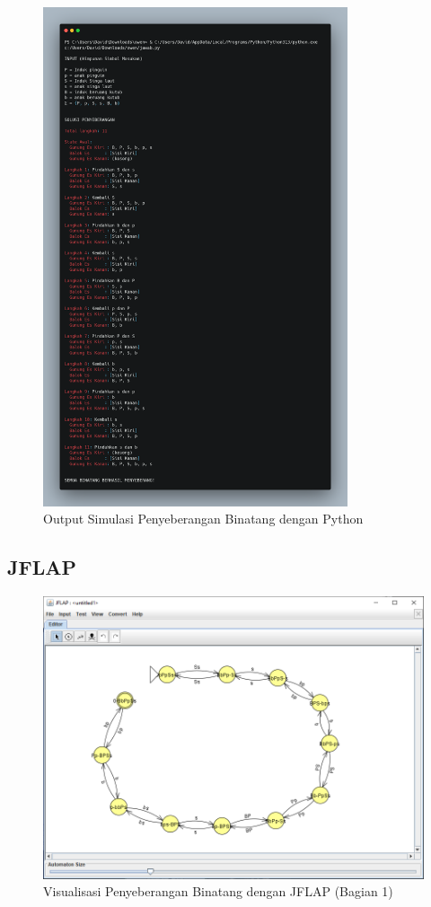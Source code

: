 \documentclass[12pt,a4paper]{article}
\begin{document}
\newpage

\begin{figure}[H]
    \centering
    \includegraphics[width=0.8\textwidth]{../images/output-python.png}
    \caption{Output Simulasi Penyeberangan Binatang dengan Python}
    \label{fig:output}
\end{figure}

\subsection*{JFLAP}
\begin{figure}[H]
    \centering
    \includegraphics[width=1\textwidth]{../images/jflap.png}
    \caption{Visualisasi Penyeberangan Binatang dengan JFLAP (Bagian 1)}
    \label{fig:jflap}
\end{figure}
\end{document}
